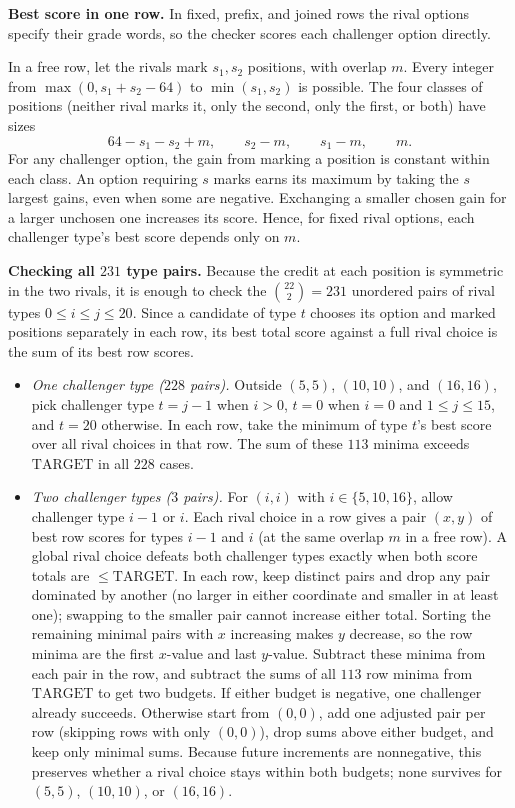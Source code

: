 \documentclass[11pt,letterpaper]{article}
\theoremstyle{cleanthm}
\newcommand{\lead}[1]{\textbf{#1}\enspace}
\newcommand{\TARGET}{\mathrm{TARGET}}
\begin{document}
\lead{Best score in one row.}
In fixed, prefix, and joined rows the rival options specify their grade words, so the checker
scores each challenger option directly.

In a free row, let the rivals mark \(s_1,s_2\) positions, with overlap \(m\). Every integer from
\(\max(0,s_1+s_2-64)\) to \(\min(s_1,s_2)\) is possible. The four classes of positions (neither
rival marks it, only the second, only the first, or both) have sizes
\[
       64-s_1-s_2+m,\qquad s_2-m,\qquad s_1-m,\qquad m .
\]
For any challenger option, the gain from marking a position is constant within each class. An
option requiring \(s\) marks earns its maximum by taking the \(s\) largest gains, even when some
are negative. Exchanging a smaller chosen gain for a larger unchosen one increases its score.
Hence, for fixed rival options, each challenger type's best score depends only on \(m\).

\lead{Checking all \(231\) type pairs.}
Because the credit at each position is symmetric in the two rivals, it is enough to check the
\(\binom{22}{2}=231\) unordered pairs of rival types \(0\le i\le j\le 20\). Since a candidate of
type \(t\) chooses its option and marked positions separately in each row, its best total score
against a full rival choice is the sum of its best row scores.
\begin{itemize}[itemsep=2pt,topsep=2pt]
 \item \emph{One challenger type (\(228\) pairs).} Outside \((5,5)\), \((10,10)\), and
   \((16,16)\), pick challenger type \(t=j-1\) when \(i>0\), \(t=0\) when \(i=0\) and
   \(1\le j\le 15\), and \(t=20\) otherwise. In each row, take the minimum of type \(t\)'s best
   score over all rival choices in that row. The sum of these \(113\) minima exceeds \(\TARGET\)
   in all \(228\) cases.
 \item \emph{Two challenger types (\(3\) pairs).} For \((i,i)\) with \(i\in\{5,10,16\}\), allow
   challenger type \(i-1\) or \(i\). Each rival choice in a row gives a pair \((x,y)\) of best row
   scores for types \(i-1\) and \(i\) (at the same overlap \(m\) in a free row). A global rival
   choice defeats both challenger types exactly when both score totals are \(\le\TARGET\). In each
   row, keep distinct pairs and drop any pair dominated by another (no larger in either coordinate
   and smaller in at least one); swapping to the smaller pair cannot increase either total.
   Sorting the remaining minimal pairs with \(x\) increasing makes \(y\) decrease, so the row
   minima are the first \(x\)-value and last \(y\)-value. Subtract these minima from each pair in
   the row, and subtract the sums of all \(113\) row minima from \(\TARGET\) to get two budgets.
   If either budget is negative, one challenger already succeeds. Otherwise start from \((0,0)\),
   add one adjusted pair per row (skipping rows with only \((0,0)\)), drop sums above either
   budget, and keep only minimal sums. Because future increments are nonnegative, this preserves
   whether a rival choice stays within both budgets; none survives for \((5,5)\), \((10,10)\), or
   \((16,16)\).
\end{itemize}
\end{document}

